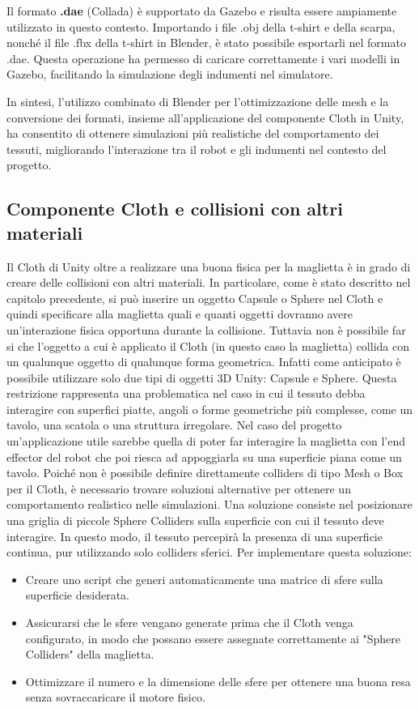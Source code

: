 \documentclass[11pt]{report}
\begin{document}
Il formato  \textbf{.dae} (Collada) è supportato da Gazebo e risulta essere ampiamente utilizzato in questo contesto. Importando i file .obj della t-shirt e della scarpa, nonché il file .fbx della t-shirt in Blender, è stato possibile esportarli nel formato .dae. Questa operazione ha permesso di caricare correttamente i vari modelli in Gazebo, facilitando la simulazione degli indumenti nel simulatore.

In sintesi, l'utilizzo combinato di Blender per l'ottimizzazione delle mesh e la conversione dei formati, insieme all'applicazione del componente Cloth in Unity, ha consentito di ottenere simulazioni più realistiche del comportamento dei tessuti, migliorando l'interazione tra il robot e gli indumenti nel contesto del progetto.

\subsection{Componente Cloth e collisioni con altri materiali}
Il Cloth di Unity oltre a realizzare una buona fisica per la maglietta è in grado di creare delle collisioni con altri materiali. In particolare, come è stato descritto nel capitolo precedente, si può inserire un oggetto Capsule o Sphere nel Cloth e quindi specificare alla maglietta quali e quanti oggetti dovranno avere un'interazione fisica opportuna durante la collisione. Tuttavia non è possibile far si che l'oggetto a cui è applicato il Cloth (in questo caso la maglietta) collida con un qualunque oggetto di qualunque forma geometrica. Infatti come anticipato è possibile utilizzare solo due tipi di oggetti 3D Unity: Capsule e Sphere. Questa restrizione rappresenta una problematica nel caso in cui il tessuto debba interagire con superfici piatte, angoli o forme geometriche più complesse, come un tavolo, una scatola o una struttura irregolare. Nel caso del progetto un'applicazione utile sarebbe quella di poter far interagire la maglietta con l'end effector del robot che poi riesca ad appoggiarla su una superficie piana come un tavolo. Poiché non è possibile definire direttamente colliders di tipo Mesh o Box per il Cloth, è necessario trovare soluzioni alternative per ottenere un comportamento realistico nelle simulazioni.
\newline
Una soluzione consiste nel posizionare una griglia di piccole Sphere Colliders sulla superficie con cui il tessuto deve interagire. In questo modo, il tessuto percepirà la presenza di una superficie continua, pur utilizzando solo colliders sferici. Per implementare questa soluzione:
\begin{itemize}
\item Creare uno script che generi automaticamente una matrice di sfere sulla superficie desiderata.
\item Assicurarsi che le sfere vengano generate prima che il Cloth venga configurato, in modo che possano essere assegnate correttamente ai "Sphere Colliders" della maglietta.
\item Ottimizzare il numero e la dimensione delle sfere per ottenere una buona resa senza sovraccaricare il motore fisico.
\end{itemize}
\end{document}
